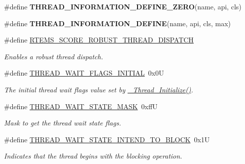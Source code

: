 \begin{DoxyCompactItemize}
\#define {\bfseries T\+H\+R\+E\+A\+D\+\_\+\+I\+N\+F\+O\+R\+M\+A\+T\+I\+O\+N\+\_\+\+D\+E\+F\+I\+N\+E\+\_\+\+Z\+E\+RO}(name,  api,  cls)
\item 
\#define {\bfseries T\+H\+R\+E\+A\+D\+\_\+\+I\+N\+F\+O\+R\+M\+A\+T\+I\+O\+N\+\_\+\+D\+E\+F\+I\+NE}(name,  api,  cls,  max)
\item 
\#define \mbox{\hyperlink{group__RTEMSScoreThread_gaf826e03e6ef568e8773a98274b64e069}{R\+T\+E\+M\+S\+\_\+\+S\+C\+O\+R\+E\+\_\+\+R\+O\+B\+U\+S\+T\+\_\+\+T\+H\+R\+E\+A\+D\+\_\+\+D\+I\+S\+P\+A\+T\+CH}}
\begin{DoxyCompactList}\small\item\em Enables a robust thread dispatch. \end{DoxyCompactList}\item 
\mbox{\label{group__RTEMSScoreThread_ga78eb026f8d00b7dfb3d8b5c82a5d888a}} 
\#define \mbox{\hyperlink{group__RTEMSScoreThread_ga78eb026f8d00b7dfb3d8b5c82a5d888a}{T\+H\+R\+E\+A\+D\+\_\+\+W\+A\+I\+T\+\_\+\+F\+L\+A\+G\+S\+\_\+\+I\+N\+I\+T\+I\+AL}}~0x0U
\begin{DoxyCompactList}\small\item\em The initial thread wait flags value set by \mbox{\hyperlink{group__RTEMSScoreThread_gab4f561fd816d0b93318afa48f609fad2}{\+\_\+\+Thread\+\_\+\+Initialize()}}. \end{DoxyCompactList}\item 
\mbox{\label{group__RTEMSScoreThread_gaac0d0df4596a8518bced0bc0a52c41c7}} 
\#define \mbox{\hyperlink{group__RTEMSScoreThread_gaac0d0df4596a8518bced0bc0a52c41c7}{T\+H\+R\+E\+A\+D\+\_\+\+W\+A\+I\+T\+\_\+\+S\+T\+A\+T\+E\+\_\+\+M\+A\+SK}}~0xffU
\begin{DoxyCompactList}\small\item\em Mask to get the thread wait state flags. \end{DoxyCompactList}\item 
\#define \mbox{\hyperlink{group__RTEMSScoreThread_ga82059fe7353c5129db4c812b7c82f6bf}{T\+H\+R\+E\+A\+D\+\_\+\+W\+A\+I\+T\+\_\+\+S\+T\+A\+T\+E\+\_\+\+I\+N\+T\+E\+N\+D\+\_\+\+T\+O\+\_\+\+B\+L\+O\+CK}}~0x1U
\begin{DoxyCompactList}\small\item\em Indicates that the thread begins with the blocking operation. \end{DoxyCompactList}\item 
\mbox{\label{group__RTEMSScoreThread_gaa9487eb8db998d29cb1f712155769583}} 

\end{DoxyCompactItemize}
